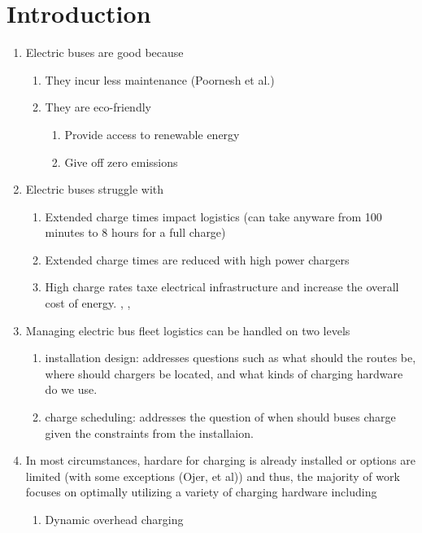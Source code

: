 \section{Introduction}
\begin{enumerate}
	\item Electric buses are good because
		\begin{enumerate}
			\item They incur less maintenance \cite{poornesh_comparative_2020}(Poornesh et al.)
			\item They are eco-friendly \cite{kato_comparative_2013}
				\begin{enumerate}
					\item Provide access to renewable energy \cite{cheng_smart_2020}
					\item Give off zero emissions
				\end{enumerate}
		\end{enumerate}
	\item Electric buses struggle with
		\begin{enumerate}
			\item Extended charge times impact logistics (can take anyware from 100 minutes to 8 hours for a full charge)
			\item Extended charge times are reduced with high power chargers
			\item High charge rates taxe electrical infrastructure and increase the overall cost of energy. \cite{stahleder_impact_2019}, \cite{deb_impact_2017}, \cite{boonraksa_impact_2019}
		\end{enumerate}
	\item Managing electric bus fleet logistics can be handled on two levels
		\begin{enumerate}
			\item installation design: addresses questions such as what should the routes be, where should chargers be located, and what kinds of charging hardware do we use.
			\item charge scheduling: addresses the question of when should buses charge given the constraints from the installaion. 
		\end{enumerate}
	\item In most circumstances, hardare for charging is already installed or options are limited (with some exceptions (Ojer, et al)) and thus, the majority of work focuses on optimally utilizing a variety of charging hardware including
		\begin{enumerate}
			\item Dynamic overhead charging \cite{csonka_optimization_2021}

\end{enumerate}
\end{enumerate}

